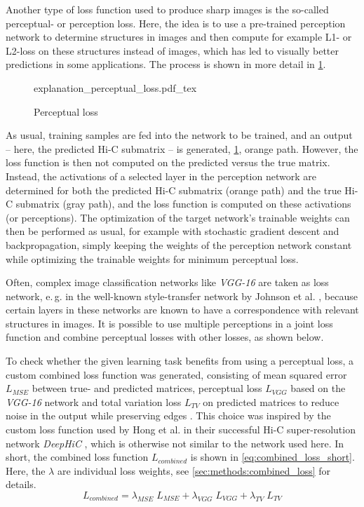 Another type of loss function used to produce sharp images is the so-called perceptual- or perception loss.
Here, the idea is to use a pre-trained perception network to determine structures in images and then compute for example L1- or L2-loss on these structures instead of images,
which has led to visually better predictions in some applications.
The process is shown in more detail in \cref{fig:improve:perceptual_loss}. 
\begin{figure}[hbt]
    \small
    \centering
    {explanation_perceptual_loss.pdf_tex}%
    \caption{Perceptual loss}
    \label{fig:improve:perceptual_loss}
\end{figure}

As usual, training samples are fed into the network to be trained, and an output -- here, the predicted Hi-C submatrix -- is generated,
\cref{fig:improve:perceptual_loss}, orange path.
However, the loss function is then not computed on the predicted versus the true matrix. 
Instead, the activations of a selected layer in the perception network are determined for both the predicted Hi-C submatrix (orange path)
and the true Hi-C submatrix (gray path), and the loss function is computed on these activations (or perceptions).
The optimization of the target network's trainable weights can then be performed as usual, for example with stochastic gradient descent and backpropagation, 
simply keeping the weights of the perception network constant while optimizing the trainable weights for minimum perceptual loss.

Often, complex image classification networks like \emph{VGG-16} \cite{Simonyan2015} are taken as loss network, 
e.\,g. in the well-known style-transfer network by Johnson et al. \cite{Johnson2016},
because certain layers in these networks are known to have a correspondence with relevant structures in images.
It is possible to use multiple perceptions in a joint loss function \cite{Johnson2016} and combine perceptual losses with other losses, as shown below.

To check whether the given learning task benefits from using a perceptual loss, a custom combined loss function was generated,
consisting of mean squared error $L_\mathit{MSE}$ between true- and predicted matrices, perceptual loss $L_\mathit{VGG}$ based on the \emph{VGG-16} network 
and total variation loss $L_\mathit{TV}$ on predicted matrices to reduce noise in the output while preserving edges \cite{Rudin1992}. 
This choice was inspired by the custom loss function used by Hong et al. in their successful Hi-C super-resolution network \emph{DeepHiC} \cite{Hong2020},
which is otherwise not similar to the network used here.
In short, the combined loss function $L_\mathit{combined}$ is shown in \cref{eq:combined_loss_short}. 
Here, the $\lambda$ are individual loss weights, see \cref{sec:methods:combined_loss} for details.
\begin{equation}
 L_\mathit{combined} = \lambda_\mathit{MSE} \; L_\mathit{MSE} + \lambda_\mathit{VGG} \; L_\mathit{VGG} + \lambda_\mathit{TV} \; L_\mathit{TV} \label{eq:combined_loss_short}
\end{equation}

